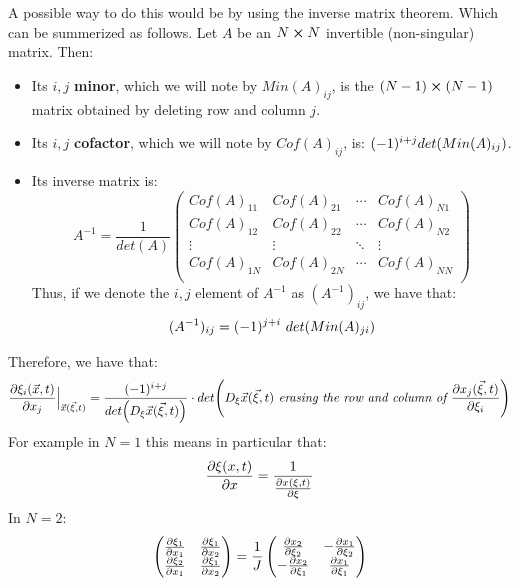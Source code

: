 \documentclass[11pt, a4paper]{article} %
\begin{document}
A possible way to do this would be by using the inverse matrix theorem. Which can be summerized as follows. Let $A$ be an $N\cross N$ invertible (non-singular) matrix. Then:
\begin{itemize}
\item Its $i,j$ {\bf minor}, which we will note by $Min(A)_{ij}$, is the $(N-1)\cross (N-1)$ matrix obtained by deleting row and column $j$.
\item Its $i,j$ {\bf cofactor}, which we will note by $Cof(A)_{ij}$, is: $(-1)^{i+j}det\qty(Min(A)_{ij})$.
\item Its inverse matrix is:
\begin{equation}
A^{-1}=\frac{1}{det(A)} \begin{pmatrix}
Cof(A)_{11} & Cof(A)_{21}&\cdots& Cof(A)_{N1}\\
Cof(A)_{12} & Cof(A)_{22}&\cdots& Cof(A)_{N2}\\
\vdots & \vdots & \ddots & \vdots \\
Cof(A)_{1N} & Cof(A)_{2N}&\cdots& Cof(A)_{NN}\\
\end{pmatrix}
\end{equation}
Thus, if we denote the $i,j$ element of $A^{-1}$ as $(A^{-1})_{ij}$, we have that:
\begin{equation}
(A^{-1})_{ij} = (-1)^{j+i}\ det\qty(Min(A)_{ji} )
\end{equation}
\end{itemize}
Therefore, we have that:
\begin{equation}
\pdv{\xi_i(\vec{x},t)}{x_j}\Big\rvert_{\vec{x}(\vec{\xi},t)} = \frac{ (-1)^{i+j}}{det \qty(D_{\xi} \vec{x}(\vec{\xi},t))}\cdot det \qty(D_{\xi} \vec{x}(\vec{\xi},t)\textit{ erasing the row and column of }\pdv{x_j(\vec{\xi},t)}{\xi_i} )
\end{equation}
For example in $N=1$ this means in particular that:
\begin{equation}
\pdv{\xi(x,t)}{x}=\frac{1}{\pdv{x(\xi,t)}{\xi}}
\end{equation}
In $N=2$:
\begin{equation}
\begin{pmatrix}
\pdv{\xi_1}{x_1} & \pdv{\xi_1}{x_2} \\
\pdv{\xi_2}{x_1} & \pdv{\xi_1}{x_2}
\end{pmatrix}= \frac{1}{J} \begin{pmatrix}
\pdv{x_2}{\xi_2} & - \pdv{x_1}{\xi_2} \\
-\pdv{x_2}{\xi_1} & \pdv{x_1}{\xi_1
} 
\end{pmatrix}
\end{equation}
\end{document}
